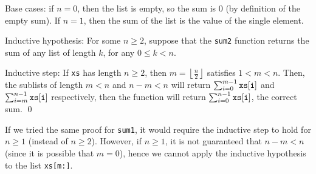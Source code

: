 \documentclass[a4paper,11pt]{article}
\newcommand{\floor}[1]{\left\lfloor #1 \right\rfloor}
\begin{document}
\begin{enumerate}
Base cases: if $n = 0$, then the list is empty, so the sum is 0 (by definition
of the empty sum). If $n = 1$, then the sum of the list is the value of the
single element.

Inductive hypothesis: For some $n \geq 2$, suppose that the {\tt sum2} function
returns the sum of any list of length $k$, for any $0 \leq k < n$.

Inductive step: If {\tt xs} has length $n \geq 2$, then
$m = \floor{\frac{n}{2}}$ satisfies $1 < m < n$. Then, the sublists of length
$m < n$ and $n-m < n$ will return $\sum_{i=0}^{m-1} {\tt xs[i]}$ and
$\sum_{i=m}^{n-1} {\tt xs[i]}$ respectively, then the function will return
$\sum_{i=0}^{n-1} {\tt xs[i]}$, the correct sum. \qed

If we tried the same proof for {\tt sum1}, it would require the inductive step
to hold for $n \geq 1$ (instead of $n \geq 2$). However, if $n \geq 1$, it is
not guaranteed that $n-m < n$ (since it is possible that $m=0$), hence we
cannot apply the inductive hypothesis to the list {\tt xs[m:]}.
\end{enumerate}
\end{document}
